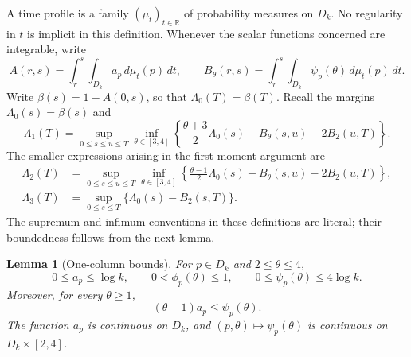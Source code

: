 \documentclass[11pt]{article}
\numberwithin{equation}{section}
\newtheorem{lemma}[theorem]{Lemma}
\theoremstyle{definition}
\theoremstyle{remark}
\newcommand{\1}{\mathbf 1}
\begin{document}
A time profile is a family $(\mu_t)_{t\in\mathbb R}$ of probability
measures on $D_k$. No regularity in $t$ is implicit in this definition.
Whenever the scalar functions concerned are integrable, write
\[
 A(r,s)=\int_r^s\int_{D_k}a_p\,d\mu_t(p)\,dt,\qquad
 B_\theta(r,s)=\int_r^s\int_{D_k}\psi_p(\theta)\,d\mu_t(p)\,dt.
\]
Write $\beta(s)=1-A(0,s)$, so that $\Lambda_0(T)=\beta(T)$.
Recall the margins $\Lambda_0(s)=\beta(s)$ and
\begin{equation}%
\label{eq:macro-margin}
 \Lambda_1(T)=\sup_{0\le s\le u\le T}\inf_{\theta\in[3,4]}
 \left\{\frac{\theta+3}{2}\Lambda_0(s)
             -B_\theta(s,u)-2B_2(u,T)\right\}.
\end{equation}
The smaller expressions arising in the first-moment argument are
\begin{align}%
\label{eq:auxiliary-margins}
 \Lambda_2(T)&=\sup_{0\le s\le u\le T}\inf_{\theta\in[3,4]}
 \left\{\frac{\theta-1}{2}\Lambda_0(s)
             -B_\theta(s,u)-2B_2(u,T)\right\},\nonumber\\
 \Lambda_3(T)&=\sup_{0\le s\le T}\{\Lambda_0(s)-B_2(s,T)\}.
\end{align}
The supremum and infimum conventions in these definitions are literal;
their boundedness follows from the next lemma.

\begin{lemma}[One-column bounds]%
\label{lem:scalar-bounds}
For $p\in D_k$ and $2\le\theta\le4$,
\[
 0\le a_p\le\log k,\qquad
 0<\phi_p(\theta)\le1,\qquad
 0\le\psi_p(\theta)\le4\log k.
\]
Moreover, for every $\theta\ge1$,
\begin{equation}%
\label{eq:one-column-dominance}
 (\theta-1)a_p\le\psi_p(\theta).
\end{equation}
The function $a_p$ is continuous on $D_k$, and
$(p,\theta)\mapsto\psi_p(\theta)$ is continuous on $D_k\times[2,4]$.
\end{lemma}
\end{document}
